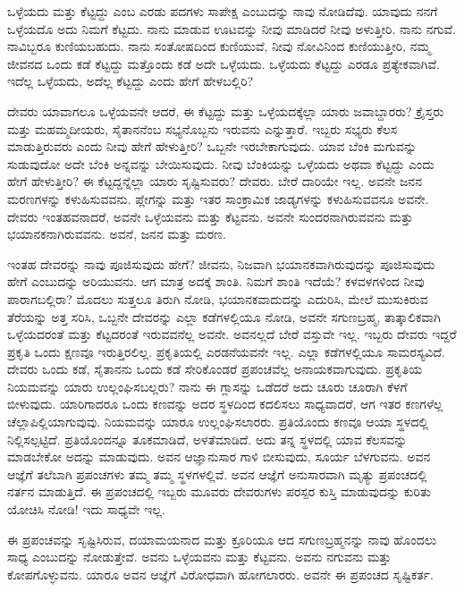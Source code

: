 ಒಳ್ಳೆಯದು ಮತ್ತು ಕೆಟ್ಟದ್ದು ಎಂಬ ಎರಡು ಪದಗಳು ಸಾಪೇಕ್ಷ ಎಂಬುದನ್ನು ನಾವು ನೋಡಿದೆವು. ಯಾವುದು ನನಗೆ ಒಳ್ಳೆಯದೊ ಅದು ನಿಮಗೆ ಕೆಟ್ಟದು. ನಾನು ಮಾಡುವ ಊಟವನ್ನು ನೀವು ಮಾಡಿದರೆ ನೀವು ಅಳುತ್ತೀರಿ. ನಾನು ನಗುವೆ. ನಾವಿಬ್ಬರೂ ಕುಣಿಯಬಹುದು. ನಾನು ಸಂತೋಷದಿಂದ ಕುಣಿಯುವೆ, ನೀವು ನೋವಿನಿಂದ ಕುಣಿಯುತ್ತೀರಿ, ನಮ್ಮ ಜೀವನದ ಒಂದು ಕಡೆ ಕೆಟ್ಟದ್ದು ಮತ್ತೊಂದು ಕಡೆ ಅದೇ ಒಳ್ಳೆಯದು. ಒಳ್ಳೆಯದು ಕೆಟ್ಟದ್ದು ಎರಡೂ ಪ್ರತ್ಯೇಕವಾಗಿವೆ. ಇದೆಲ್ಲ ಒಳ್ಳೆಯದು, ಅದೆಲ್ಲ ಕೆಟ್ಟದ್ದು ಎಂದು ಹೇಗೆ ಹೇಳಬಲ್ಲಿರಿ?

ದೇವರು ಯಾವಾಗಲೂ ಒಳ್ಳೆಯವನೇ ಆದರೆ, ಈ ಕೆಟ್ಟದ್ದು ಮತ್ತು ಒಳ್ಳೆಯದಕ್ಕೆಲ್ಲಾ ಯಾರು ಜವಾಬ್ದಾರರು? ಕ್ರೈಸ್ತರು ಮತ್ತು ಮಹಮ್ಮದೀಯರು, ಸೈತಾನನೆಂಬ ಸಭ್ಯನೊಬ್ಬನು ಇರುವನು ಎನ್ನುತ್ತಾರೆ. ಇಬ್ಬರು ಸಭ್ಯರು ಕೆಲಸ ಮಾಡುತ್ತಿರುವರು ಎಂದು ನೀವು ಹೇಗೆ ಹೇಳುತ್ತೀರಿ? ಒಬ್ಬನೇ ಇರಬೇಕಾಗುವುದು. ಯಾವ ಬೆಂಕಿ ಮಗುವನ್ನು ಸುಡುವುದೋ ಅದೇ ಬೆಂಕಿ ಅನ್ನವನ್ನು ಬೇಯಿಸುವುದು. ನೀವು ಬೆಂಕಿಯನ್ನು ಒಳ್ಳೆಯದು ಅಥವಾ ಕೆಟ್ಟದ್ದು ಎಂದು ಹೇಗೆ ಹೇಳುತ್ತೀರಿ? ಈ ಕೆಟ್ಟದ್ದನ್ನೆಲ್ಲಾ ಯಾರು ಸೃಷ್ಟಿಸುವರು? ದೇವರು. ಬೇರೆ ದಾರಿಯೇ ಇಲ್ಲ. ಅವನೇ ಜನನ ಮರಣಗಳನ್ನು ಕಳುಹಿಸುವವನು. ಪ್ಲೇಗನ್ನು ಮತ್ತು ಇತರ ಸಾಂಕ್ರಾಮಿಕ ಜಾಡ್ಯಗಳನ್ನು ಕಳುಹಿಸುವವನೂ ಅವನೇ. ದೇವರು ಇಂತಹವನಾದರೆ, ಅವನೇ ಒಳ್ಳೆಯವನು ಮತ್ತು ಕೆಟ್ಟವನು. ಅವನೇ ಸುಂದರನಾಗಿರುವವನು ಮತ್ತು ಭಯಾನಕನಾಗಿರುವವನು. ಅವನೆ, ಜನನ ಮತ್ತು ಮರಣ.

ಇಂತಹ ದೇವರನ್ನು ನಾವು ಪೂಜಿಸುವುದು ಹೇಗೆ? ಜೀವನು, ನಿಜವಾಗಿ ಭಯಾನಕವಾಗಿರುವುದನ್ನು ಪೂಜಿಸುವುದು ಹೇಗೆ ಎಂಬುದನ್ನು ಅರಿಯುವನು. ಆಗ ಮಾತ್ರ ಅದಕ್ಕೆ ಶಾಂತಿ. ನಿಮಗೆ ಶಾಂತಿ ಇದೆಯೆ? ಕಳವಳಗಳಿಂದ ನೀವು ಪಾರಾಗಬಲ್ಲಿರಾ? ಮೊದಲು ಸುತ್ತಲೂ ತಿರುಗಿ ನೋಡಿ, ಭಯಾನಕವಾದುದನ್ನು ಎದುರಿಸಿ, ಮೇಲೆ ಮುಸುಕಿರುವ ತೆರೆಯನ್ನು ಅತ್ತ ಸರಿಸಿ, ಒಬ್ಬನೇ ದೇವರನ್ನು ಎಲ್ಲಾ ಕಡೆಗಳಲ್ಲಿಯೂ ನೋಡಿ, ಅವನೇ ಸಗುಣಬ್ರಹ್ಮ, ತಾತ್ಕಾಲಿಕವಾಗಿ ಒಳ್ಳೆಯದರಂತೆ ಮತ್ತು ಕೆಟ್ಟದರಂತೆ ಇರುವವನೆಲ್ಲ ಅವನೇ. ಅವನಲ್ಲದೆ ಬೇರೆ ವಸ್ತುವೇ ಇಲ್ಲ. ಇಬ್ಬರು ದೇವರು ಇದ್ದರೆ ಪ್ರಕೃತಿ ಒಂದು ಕ್ಷಣವೂ ಇರುತ್ತಿರಲಿಲ್ಲ. ಪ್ರಕೃತಿಯಲ್ಲಿ ಎರಡನೆಯವನೇ ಇಲ್ಲ. ಎಲ್ಲಾ ಕಡೆಗಳಲ್ಲಿಯೂ ಸಾಮರಸ್ಯವಿದೆ. ದೇವರು ಒಂದು ಕಡೆ, ಸೈತಾನನು ಒಂದು ಕಡೆ ಸೇರಿಕೊಂಡರೆ ಪ್ರಪಂಚವೆಲ್ಲ ಅನಾಯಕವಾಗುವುದು. ಪ್ರಕೃತಿಯ ನಿಯಮವನ್ನು ಯಾರು ಉಲ್ಲಂಘಿಸಬಲ್ಲರು? ನಾನು ಈ ಗ್ಲಾಸನ್ನು ಒಡೆದರೆ ಅದು ಚೂರು ಚೂರಾಗಿ ಕೆಳಗೆ ಬೀಳುವುದು. ಯಾರಿಗಾದರೂ ಒಂದು ಕಣವನ್ನು ಅದರ ಸ್ಥಳದಿಂದ ಕದಲಿಸಲು ಸಾಧ್ಯವಾದರೆ, ಆಗ ಇತರ ಕಣಗಳೆಲ್ಲ ಚೆಲ್ಲಾಪಿಲ್ಲಿಯಾಗುವುವು. ನಿಯಮವನ್ನು ಯಾರೂ ಉಲ್ಲಂಘಿಸಲಾರರು. ಪ್ರತಿಯೊಂದು ಕಣವೂ ಆಯಾ ಸ್ಥಳದಲ್ಲಿ ನಿಲ್ಲಿಸಲ್ಪಟ್ಟಿದೆ. ಪ್ರತಿಯೊಂದನ್ನೂ ತೂಕಮಾಡಿದೆ, ಅಳತೆಮಾಡಿದೆ. ಅದು ತನ್ನ ಸ್ಥಳದಲ್ಲಿ ಯಾವ ಕೆಲಸವನ್ನು ಮಾಡಬೇಕೋ ಅದನ್ನು ಮಾಡುವುದು. ಅವನ ಆಜ್ಞಾನುಸಾರ ಗಾಳಿ ಬೀಸುವುದು, ಸೂರ್ಯ ಬೆಳಗುವನು. ಅವನ ಆಜ್ಞೆಗೆ ತಲೆಬಾಗಿ ಪ್ರಪಂಚಗಳು ತಮ್ಮ ತಮ್ಮ ಸ್ಥಳಗಳಲ್ಲಿವೆ. ಅವನ ಆಜ್ಞೆಗೆ ಅನುಸಾರವಾಗಿ ಮೃತ್ಯು ಪ್ರಪಂಚದಲ್ಲಿ ನರ್ತನ ಮಾಡುತ್ತಿದೆ. ಈ ಪ್ರಪಂಚದಲ್ಲಿ ಇಬ್ಬರು ಮೂವರು ದೇವರುಗಳು ಪರಸ್ಪರ ಕುಸ್ತಿ ಮಾಡುವುದನ್ನು ಕುರಿತು ಯೋಚಿಸಿ ನೋಡಿ! ಇದು ಸಾಧ್ಯವೇ ಇಲ್ಲ.

\vskip 2pt

ಈ ಪ್ರಪಂಚವನ್ನು ಸೃಷ್ಟಿಸಿರುವ, ದಯಾಮಯನಾದ ಮತ್ತು ಕ್ರೂರಿಯೂ ಆದ ಸಗುಣಬ್ರಹ್ಮನನ್ನು ನಾವು ಹೊಂದಲು ಸಾಧ್ಯ ಎಂಬುದನ್ನು ನೋಡುತ್ತೇವೆ. ಅವನು ಒಳ್ಳೆಯವನು ಮತ್ತು ಕೆಟ್ಟವನು. ಅವನು ನಗುವನು ಮತ್ತು ಕೋಪಗೊಳ್ಳುವನು. ಯಾರೂ ಅವನ ಆಜ್ಞೆಗೆ ವಿರೋಧವಾಗಿ ಹೋಗಲಾರರು. ಅವನೇ ಈ ಪ್ರಪಂಚದ ಸೃಷ್ಟಿಕರ್ತ.

